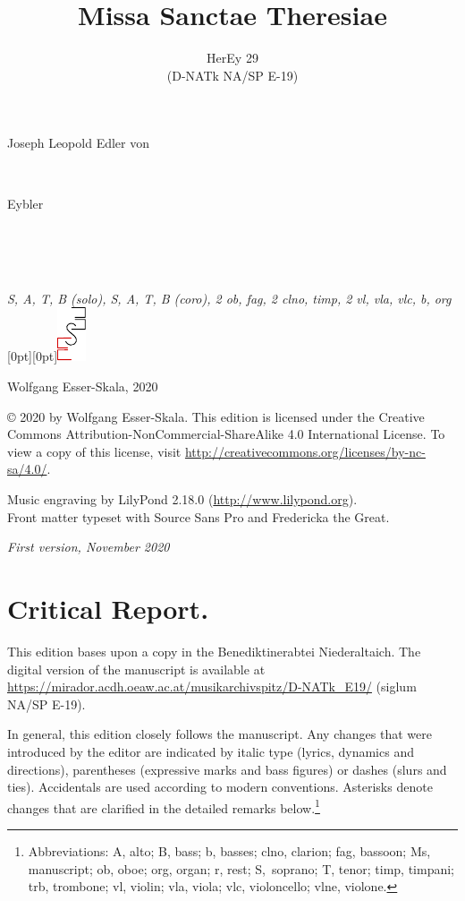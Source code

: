 \documentclass[parskip=full]{scrreprt}
\makeatletter
\DeclareRobustCommand{\sbseries}{\fontseries{sb}\selectfont}
\newcommand\fancytitlehead{
	\headingfont%
	\fontsize{80}{80}\selectfont\textcolor{black!80}{\@ifundefined{@shortname}{\@lastname}{\@shortname}.}\\[15pt]%
	\fontsize{55}{55}\selectfont\@ifundefined{@shorttitle}{\@title}{\@shorttitle}.%
}
\def\firstname#1{\def\@firstname{#1}}
\def\lastname#1{\def\@lastname{#1}}
\def\shorttitle#1{\def\@shorttitle{#1}}
\def\instrumentation#1{\def\@instrumentation{#1}}
\def\maketitle{%
\begin{titlepage}%
	\Large%
	{\@titlehead}%
	\vfill%
	{\strut\@firstname}\\%
	{\sbseries\color{oldred}\strut\@lastname}\\%
	{\strut\@namesuffix}%
	\vfill%
	{\sbseries\@title}\\%
	{\@subtitle}\\[\baselineskip]%
	{\itshape\@instrumentation}%
	\vfill%
	{\itshape\@parts}\hspace*{\fill}\raisebox{0pt}[0pt][0pt]{\includegraphics{ees_logo}}%
\end{titlepage}%
}
\newif\ifprintreport\printreportfalse
\makeatother
\begin{document}
\frenchspacing

\titlehead{\fancytitlehead}
\firstname{Joseph Leopold Edler von}
\lastname{Eybler}
\title{Missa Sanctae Theresiae}
\shorttitle{Missa S. Theresiae}
\subtitle{HerEy 29\\(D-NATk NA/SP E-19)}
\instrumentation{S, A, T, B (solo), S, A, T, B (coro), 2 ob, fag, 2 clno, timp, 2 vl, vla, vlc, b, org}
\maketitle


\thispagestyle{empty}

\vspace*{\fill}

\hspace*{1em}Wolfgang Esser-Skala, 2020

© 2020 by Wolfgang Esser-Skala. This edition is licensed under the Creative Commons Attribution-NonCommercial-ShareAlike 4.0 International License. To view a copy of this license, visit \url{http://creativecommons.org/licenses/by-nc-sa/4.0/}. 

Music engraving by LilyPond 2.18.0 (\url{http://www.lilypond.org}).\\
Front matter typeset with Source Sans Pro and Fredericka the Great.

\textit{First version, November 2020}

\vspace*{2cm}

\ifprintreport
\chapter*{Critical Report.}

This edition bases upon a copy in the Benediktinerabtei Niederaltaich. The digital version of the manuscript is available at \url{https://mirador.acdh.oeaw.ac.at/musikarchivspitz/D-NATk_E19/} (siglum NA/SP E-19).

In general, this edition closely follows the manuscript. Any changes that were introduced by the editor are indicated by italic type (lyrics, dynamics and directions), parentheses (expressive marks and bass figures) or dashes (slurs and ties). Accidentals are used according to modern conventions. Asterisks denote changes that are clarified in the detailed remarks below.\footnote{Abbreviations: A, alto; B, bass; b, basses; clno, clarion; fag, bassoon; Ms, manuscript; ob, oboe; org, organ; r, rest; S,~soprano; T, tenor; timp, timpani; trb, trombone; vl, violin; vla, viola; vlc, violoncello; vlne, violone.}
\end{document}
